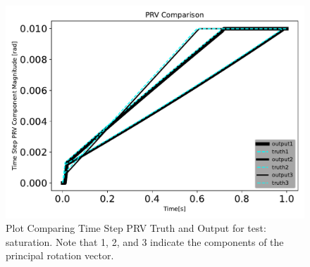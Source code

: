 \begin{figure}[htbp]\centerline{\includegraphics[height=0.7\textwidth, keepaspectratio]{AutoTeX/saturationPRVcomparison}}\caption{Plot Comparing Time Step PRV Truth and Output for test: saturation. Note that 1, 2, and 3 indicate the components of the principal rotation vector.}\label{fig:saturationPRVcomparison}\end{figure}